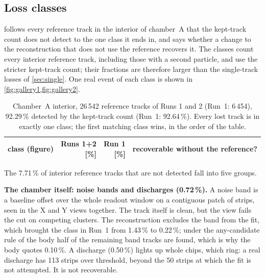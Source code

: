 \subsection{Loss classes}\label{app:losses}
 follows every reference track in the interior of chamber~A that the kept-track count does not
detect to the one class it ends in, and says whether a change to the reconstruction that does not use the reference
recovers it. The classes count every interior reference track, including those with a second particle, and use the
stricter kept-track count; their fractions are therefore larger than the single-track losses of \cref{sec:single}. One
real event of each class is shown in \cref{fig:gallery1,fig:gallery2}.

\begin{table}[tbp]
  \centering\small
  \caption{Chamber~A interior, 26\,542 reference tracks of Runs 1 and 2 (Run~1: 6\,454), 92.29\,\% detected by the
  kept-track count (Run~1: 92.64\,\%). Every lost track is in exactly one class; the first matching class wins, in the
  order of the table.}
  \label{tab:losses}
  \begin{tabular}{p{5.3cm}rrp{6.6cm}}
    \hline
    class (figure) & \shortstack{Runs 1+2\\{}[\%]} & \shortstack{Run 1\\{}[\%]} & recoverable without the reference? \\
    \hline
  \end{tabular}
\end{table}

The 7.71\,\% of interior reference tracks that are not detected fall into five groups.

\textbf{The chamber itself: noise bands and discharges (0.72\,\%).} A noise band is a baseline offset over the whole
readout window on a contiguous patch of strips, seen in the X and Y views together. The track itself is clean, but the
view fails the cut on competing clusters. The reconstruction excludes the band from the fit, which brought the class
in Run~1 from 1.43\,\% to 0.22\,\%; under the any-candidate rule of the body half of the remaining band tracks are
found, which is why the body quotes 0.10\,\%. A discharge (0.50\,\%) lights up whole chips, which ring: a real
discharge has 113 strips over threshold, beyond the 50 strips at which the fit is not attempted. It is not
recoverable.

